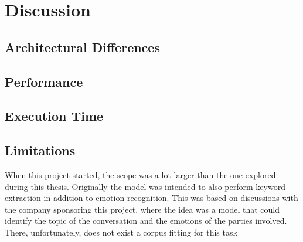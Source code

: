 \documentclass[nofilelist]{cslthse-msc}
\begin{document}




\chapter{Discussion}





\section{Architectural Differences}

\section{Performance}

\section{Execution Time}

\section{Limitations}

When this project started, the scope was a lot larger than the one explored during this thesis. Originally the model was intended to also perform keyword extraction in addition to emotion recognition. This was based on discussions with the company sponsoring this project, where the idea was a model that could identify the topic of the conversation and the emotions of the parties involved. There, unfortunately, does not exist a corpus fitting for this task 
\end{document}
